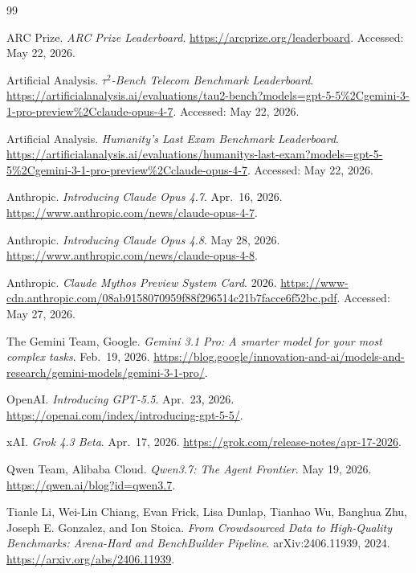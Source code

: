 \documentclass[10pt,letterpaper,twocolumn]{article}
\begin{document}
\begingroup
\small
\begin{thebibliography}{99}

ARC Prize. \emph{ARC Prize Leaderboard}. \url{https://arcprize.org/leaderboard}. Accessed: May 22, 2026.

Artificial Analysis. \emph{$\tau^2$-Bench Telecom Benchmark Leaderboard}. \url{https://artificialanalysis.ai/evaluations/tau2-bench?models=gpt-5-5%2Cgemini-3-1-pro-preview%2Cclaude-opus-4-7}. Accessed: May 22, 2026.

Artificial Analysis. \emph{Humanity's Last Exam Benchmark Leaderboard}. \url{https://artificialanalysis.ai/evaluations/humanitys-last-exam?models=gpt-5-5%2Cgemini-3-1-pro-preview%2Cclaude-opus-4-7}. Accessed: May 22, 2026.

Anthropic.
\emph{Introducing Claude Opus 4.7}.
Apr.\ 16, 2026.
\url{https://www.anthropic.com/news/claude-opus-4-7}.

Anthropic.
\emph{Introducing Claude Opus 4.8}.
May 28, 2026.
\url{https://www.anthropic.com/news/claude-opus-4-8}.

Anthropic. \emph{Claude Mythos Preview System Card}. 2026.
\url{https://www-cdn.anthropic.com/08ab9158070959f88f296514c21b7facce6f52bc.pdf}. Accessed: May 27, 2026.

The Gemini Team, Google.
\emph{Gemini 3.1 Pro: A smarter model for your most complex tasks}.
Feb.\ 19, 2026.
\url{https://blog.google/innovation-and-ai/models-and-research/gemini-models/gemini-3-1-pro/}.

OpenAI.
\emph{Introducing GPT-5.5}.
Apr.\ 23, 2026.
\url{https://openai.com/index/introducing-gpt-5-5/}.

xAI.
\emph{Grok 4.3 Beta}.
Apr.\ 17, 2026.
\url{https://grok.com/release-notes/apr-17-2026}.

Qwen Team, Alibaba Cloud.
\emph{Qwen3.7: The Agent Frontier}.
May 19, 2026.
\url{https://qwen.ai/blog?id=qwen3.7}.

Tianle Li, Wei-Lin Chiang, Evan Frick, Lisa Dunlap, Tianhao Wu, Banghua Zhu,
Joseph E. Gonzalez, and Ion Stoica.
\emph{From Crowdsourced Data to High-Quality Benchmarks: Arena-Hard and BenchBuilder Pipeline}.
arXiv:2406.11939, 2024.
\url{https://arxiv.org/abs/2406.11939}.


\end{thebibliography}
\end{document}
